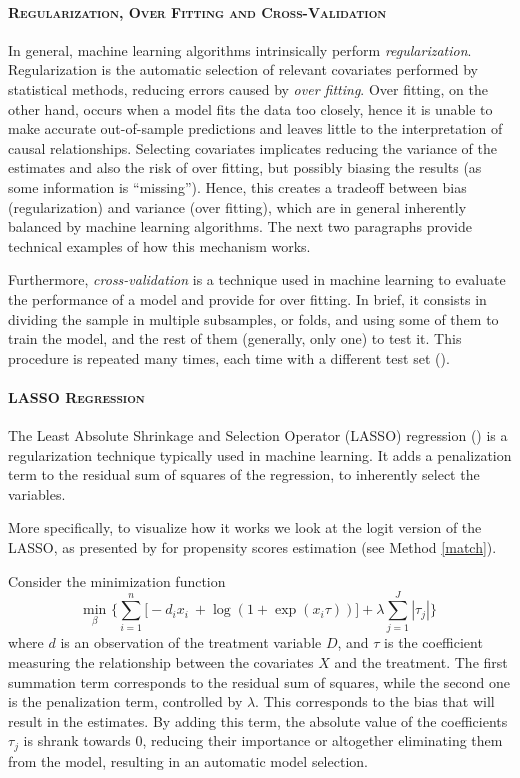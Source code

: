 \documentclass[12pt,a4paper,openright,twoside]{book}
\begin{document}
\begin{doublespacing}
\paragraph{\scshape Regularization, Over Fitting and Cross-Validation} \label{regofcv}

In general, machine learning algorithms intrinsically perform \textit{regularization}. Regularization is the automatic selection of relevant covariates performed by statistical methods, reducing errors caused by \textit{over fitting}. Over fitting, on the other hand, occurs when a model fits the data too closely, hence it is unable to make accurate out-of-sample predictions and leaves little to the interpretation of causal relationships. Selecting covariates implicates reducing the variance of the estimates and also the risk of over fitting, but possibly biasing the results (as some information is ``missing''). Hence, this creates a tradeoff between bias (regularization) and variance (over fitting), which are in general inherently balanced by machine learning algorithms. 
The next two paragraphs provide technical examples of how this mechanism works. 

Furthermore, \textit{cross-validation} is a technique used in machine learning to evaluate the performance of a model and provide for over fitting. In brief, it consists in dividing the sample in multiple subsamples, or folds, and using some of them to train the model, and the rest of them (generally, only one) to test it. This procedure is repeated many times, each time with a different test set (\citealp{Refaeilzadeh2009}). 


\paragraph{\scshape LASSO Regression}\label{lasso}
The Least Absolute Shrinkage and Selection Operator (LASSO) regression (\citealp{tibshirani1996regression}) is a regularization technique typically used in machine learning. It adds a penalization term to the residual sum of squares of the regression, to inherently select the variables.

More specifically, to visualize how it works we look at the logit version of the LASSO, as presented by \citet{goller2020does} for propensity scores estimation (see Method \ref{match}). 

Consider the minimization function 
\begin{equation}
    \underset{\beta}{\text{min}} \,\, \Biggl\{ \sum_{i=1}^{n} \bigl[ -d_i x_i \ + \log (1 + \exp (x_i \tau)) \bigr] + \lambda \sum_{j=1}^{J} |\tau_j| \Biggr\} 
\end{equation}
where $d$ is an observation of the treatment variable $D$, and $\tau$ is the coefficient measuring the relationship between the covariates $X$ and the treatment. The first summation term corresponds to the residual sum of squares, while the second one is the penalization term, controlled by $\lambda$. This corresponds to the bias that will result in the estimates. By adding this term, the absolute value of the coefficients $\tau_j$ is shrank towards 0, reducing their importance or altogether eliminating them from the model, resulting in an automatic model selection.


\end{doublespacing}
\end{document}
